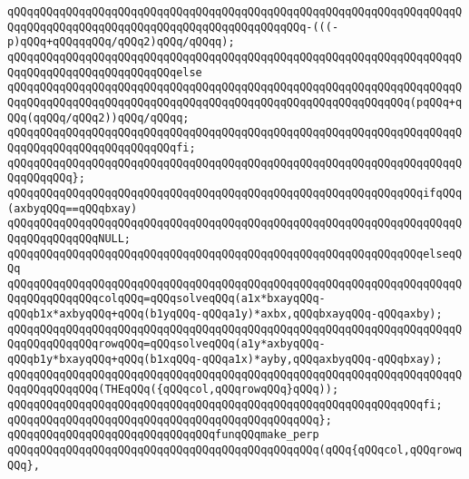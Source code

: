 \newline
\verb|qQQqqQQqqQQqqQQqqQQqqQQqqQQqqQQqqQQqqQQqqQQqqQQqqQQqqQQqqQQqqQQqqQQqqQQqqQQqqQQqqQQqqQQqqQQqqQQqqQQqqQQqqQQqqQQqqQQq-(((-p)qQQq+qQQqqqQQq/qQQq2)qQQq/qQQqq);|\newline
\verb|qQQqqQQqqQQqqQQqqQQqqQQqqQQqqQQqqQQqqQQqqQQqqQQqqQQqqQQqqQQqqQQqqQQqqQQqqQQqqQQqqQQqqQQqqQQqqQQqelse|\newline
\verb|qQQqqQQqqQQqqQQqqQQqqQQqqQQqqQQqqQQqqQQqqQQqqQQqqQQqqQQqqQQqqQQqqQQqqQQqqQQqqQQqqQQqqQQqqQQqqQQqqQQqqQQqqQQqqQQqqQQqqQQqqQQqqQQqqQQq(pqQQq+qQQq(qqQQq/qQQq2))qQQq/qQQqq;|\newline
\verb|qQQqqQQqqQQqqQQqqQQqqQQqqQQqqQQqqQQqqQQqqQQqqQQqqQQqqQQqqQQqqQQqqQQqqQQqqQQqqQQqqQQqqQQqqQQqqQQqfi;|\newline
\verb|qQQqqQQqqQQqqQQqqQQqqQQqqQQqqQQqqQQqqQQqqQQqqQQqqQQqqQQqqQQqqQQqqQQqqQQqqQQqqQQq};|\newline
\newline
\verb|qQQqqQQqqQQqqQQqqQQqqQQqqQQqqQQqqQQqqQQqqQQqqQQqqQQqqQQqqQQqqQQqifqQQq(axbyqQQq==qQQqbxay)|\newline
\newline
\verb|qQQqqQQqqQQqqQQqqQQqqQQqqQQqqQQqqQQqqQQqqQQqqQQqqQQqqQQqqQQqqQQqqQQqqQQqqQQqqQQqqQQqNULL;|\newline
\verb|qQQqqQQqqQQqqQQqqQQqqQQqqQQqqQQqqQQqqQQqqQQqqQQqqQQqqQQqqQQqqQQqelseqQQq|\newline
\verb|qQQqqQQqqQQqqQQqqQQqqQQqqQQqqQQqqQQqqQQqqQQqqQQqqQQqqQQqqQQqqQQqqQQqqQQqqQQqqQQqqQQqcolqQQq=qQQqsolveqQQq(a1x*bxayqQQq-qQQqb1x*axbyqQQq+qQQq(b1yqQQq-qQQqa1y)*axbx,qQQqbxayqQQq-qQQqaxby);|\newline
\verb|qQQqqQQqqQQqqQQqqQQqqQQqqQQqqQQqqQQqqQQqqQQqqQQqqQQqqQQqqQQqqQQqqQQqqQQqqQQqqQQqqQQqrowqQQq=qQQqsolveqQQq(a1y*axbyqQQq-qQQqb1y*bxayqQQq+qQQq(b1xqQQq-qQQqa1x)*ayby,qQQqaxbyqQQq-qQQqbxay);|\newline
\newline
\verb|qQQqqQQqqQQqqQQqqQQqqQQqqQQqqQQqqQQqqQQqqQQqqQQqqQQqqQQqqQQqqQQqqQQqqQQqqQQqqQQqqQQq(THEqQQq({qQQqcol,qQQqrowqQQq}qQQq));|\newline
\verb|qQQqqQQqqQQqqQQqqQQqqQQqqQQqqQQqqQQqqQQqqQQqqQQqqQQqqQQqqQQqqQQqfi;|\newline
\verb|qQQqqQQqqQQqqQQqqQQqqQQqqQQqqQQqqQQqqQQqqQQqqQQq};|\newline
\newline
\newline
\verb|qQQqqQQqqQQqqQQqqQQqqQQqqQQqqQQqfunqQQqmake_perp|\newline
\verb|qQQqqQQqqQQqqQQqqQQqqQQqqQQqqQQqqQQqqQQqqQQqqQQq(qQQq{qQQqcol,qQQqrowqQQq},|\newline
